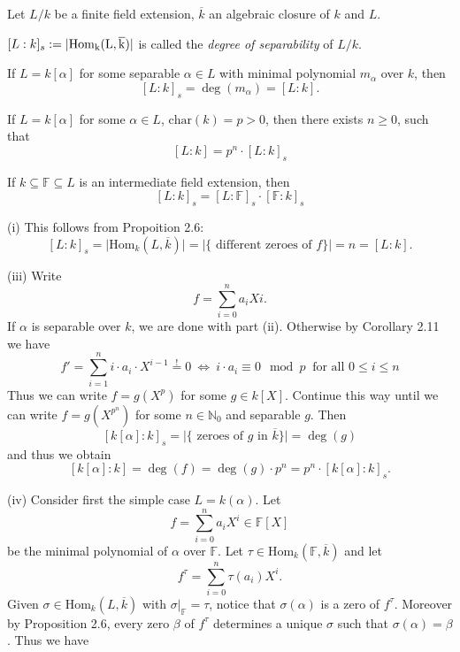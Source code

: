 \documentclass[11pt]{book}
\theoremstyle{nonumberbreak}
\newenvironment{pr}[1][]{\ifthenelse{\equal{#1}{}}{\proof}{\proof[#1]}\rm}{\endproof}
\newenvironment{definprop}[1][]{\ifthenelse{\equal{#1}{}}{\definiprop}{\definiprop[#1]}\rm}{\enddefiniprop}
\begin{document}
\begin{spacing}{1.3}
\begin{definprop} %
Let $L/k$ be a finite field extension, $\overline{k}$ an algebraic closure of $k$ and $L$. 
\begin{compactenum}
\item $[L:k]_s:= \vert \rm{Hom}_{k}(L, \overline{k}) \vert$ is called the \textit{degree of separability} of $L/k$.
\item If $L=k[\alpha]$ for some separable $\alpha \in L$ with minimal polynomial $m_{\alpha}$ over $k$, then
$$[L:k]_s=\deg(m_{\alpha})=[L:k].$$
\item If $L=k[\alpha]$ for some $\alpha \in L$, $\textrm{char}(k)=p>0$, then there exists $n \geqslant 0$, such that
$$[L:k] = p^n \cdot [L:k]_s$$
\item  If $k \subseteq \mathbb{F} \subseteq L$ is an intermediate field extension, then
$$[L:k]_s=[L:\mathbb{F}]_s \cdot [\mathbb{F}:k]_s$$
\end{compactenum}
\begin{pr}
\begin{compactenum}
\item[(i)] This follows from Propoition 2.6:
$$[L:k]_s=\vert \textrm{Hom}_{k}(L, \overline{k}) \vert = \vert \{ \textrm{ different zeroes of } f \} \vert =n = [L:k].$$
\item[(iii)] Write 
$$f=\sum_{i=0}^n a_iX{i}.$$
If $\alpha$ is separable over $k$, we are done with part (ii). Otherwise by Corollary 2.11 we have
$$f'=\sum_{i=1}^n i \cdot a_i \cdot X^{i-1}\overset{!}{=} 0 \ \Longleftrightarrow \ i \cdot a_i \equiv 0 \mod p \ \textrm{ for all } 0 \leqslant i \leqslant n $$
Thus we can write $f=g(X^p)$ for some $g \in k[X]$.
Continue this way until we can write $f=g(X^{p^n})$ for some $n \in \mathbb{N}_0$ and separable $g$. Then 
$$[k[\alpha]:k]_s=\vert \{ \textrm{ zeroes of }g \textrm{ in } \overline{k} \} \vert =\deg(g)$$
and thus we obtain
$$[k[\alpha]:k]=\deg(f)=\deg(g) \cdot p^n =p^n \cdot [k[\alpha]:k]_s.$$
\item[(iv)] Consider first the simple case $L=k(\alpha)$. Let
$$f=\sum_{i=0}^n a_i X^{i} \in\mathbb{F}[X]$$
be the minimal polynomial of $\alpha$ over $\mathbb{F}$. Let $\tau \in \textrm{Hom}_{k}(\mathbb{F}, \overline{k})$ and let
$$f^{\tau}=\sum_{i=0}^n \tau(a_i) X^{i}.$$
Given $\sigma \in \textrm{Hom}_{k}(L, \overline{k})$ with $\sigma |_{\mathbb{F}}=\tau$, notice that $\sigma(\alpha)$ is a zero of $f^{\tau}$. Moreover by Proposition 2.6, every zero $\beta$ of $f^{\tau}$ determines a unique $\sigma$ such that $\sigma(\alpha)=\beta$.
Thus we have

\end{compactenum}
\end{pr}
\end{definprop}
\end{spacing}
\end{document}
